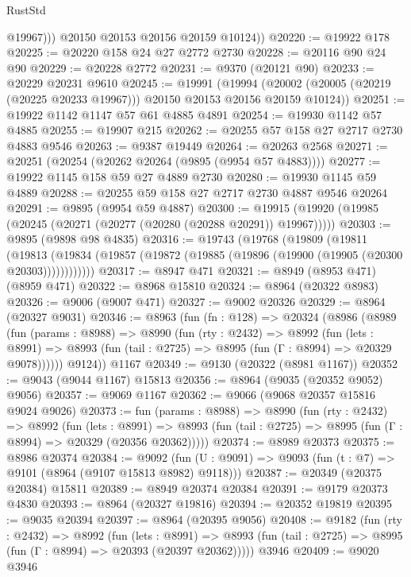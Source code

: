 \begin{lexlean}{RustStd}
\begin{coremodule}
              @19967)))
        @20150
        @20153
        @20156
        @20159
        @10124))
@20220 := @19922 @178
@20225 := @20220 @158 @24 @27 @2772 @2730
@20228 := @20116 @90 @24 @90
@20229 := @20228 @2772
@20231 := @9370 (@20121 @90)
@20233 := @20229 @20231 @9610
@20245 := @19991
    (@19994 (@20002 (@20005 (@20219 (@20225 @20233 @19967))) @20150 @20153 @20156 @20159 @10124))
@20251 := @19922 @1142 @1147 @57 @61 @4885 @4891
@20254 := @19930 @1142 @57 @4885
@20255 := @19907 @215
@20262 := @20255 @57 @158 @27 @2717 @2730 @4883 @9546
@20263 := @9387 @19449
@20264 := @20263 @2568
@20271 := @20251 (@20254 (@20262 @20264 (@9895 (@9954 @57 @4883))))
@20277 := @19922 @1145 @158 @59 @27 @4889 @2730
@20280 := @19930 @1145 @59 @4889
@20288 := @20255 @59 @158 @27 @2717 @2730 @4887 @9546 @20264
@20291 := @9895 (@9954 @59 @4887)
@20300 := @19915 (@19920 (@19985 (@20245 (@20271 (@20277 (@20280 (@20288 @20291)) @19967)))))
@20303 := @9895 (@9898 @98 @4835)
@20316 := @19743
    (@19768
      (@19809
        (@19811
          (@19813 (@19834 (@19857 (@19872 (@19885 (@19896 (@19900 (@19905 (@20300 @20303))))))))))))
@20317 := @8947 @471
@20321 := @8949 (@8953 @471) (@8959 @471)
@20322 := @8968 @15810
@20324 := @8964 (@20322 @8983)
@20326 := @9006 (@9007 @471)
@20327 := @9002 @20326
@20329 := @8964 (@20327 @9031)
@20346 := @8963
    (fun (fn : @128) =>
    @20324
      (@8986
        (@8989
          (fun (params : @8988) =>
          @8990
            (fun (rty : @2432) =>
            @8992
              (fun (lets : @8991) =>
              @8993 (fun (tail : @2725) => @8995 (fun (Γ : @8994) => @20329 @9078))))))
        @9124))
    @1167
@20349 := @9130 (@20322 (@8981 @1167))
@20352 := @9043 (@9044 @1167) @15813
@20356 := @8964 (@9035 (@20352 @9052) @9056)
@20357 := @9069 @1167
@20362 := @9066 (@9068 @20357 @15816 @9024 @9026)
@20373 := fun (params : @8988) =>
  @8990
    (fun (rty : @2432) =>
    @8992
      (fun (lets : @8991) =>
      @8993 (fun (tail : @2725) => @8995 (fun (Γ : @8994) => @20329 (@20356 @20362)))))
@20374 := @8989 @20373
@20375 := @8986 @20374
@20384 := @9092
    (fun (U : @9091) => @9093 (fun (t : @7) => @9101 (@8964 (@9107 @15813 @8982) @9118)))
@20387 := @20349 (@20375 @20384) @15811
@20389 := @8949 @20374 @20384
@20391 := @9179 @20373 @4830
@20393 := @8964 (@20327 @19816)
@20394 := @20352 @19819
@20395 := @9035 @20394
@20397 := @8964 (@20395 @9056)
@20408 := @9182
    (fun (rty : @2432) =>
    @8992
      (fun (lets : @8991) =>
      @8993 (fun (tail : @2725) => @8995 (fun (Γ : @8994) => @20393 (@20397 @20362)))))
    @3946
@20409 := @9020 @3946

\end{coremodule}
\end{lexlean}
